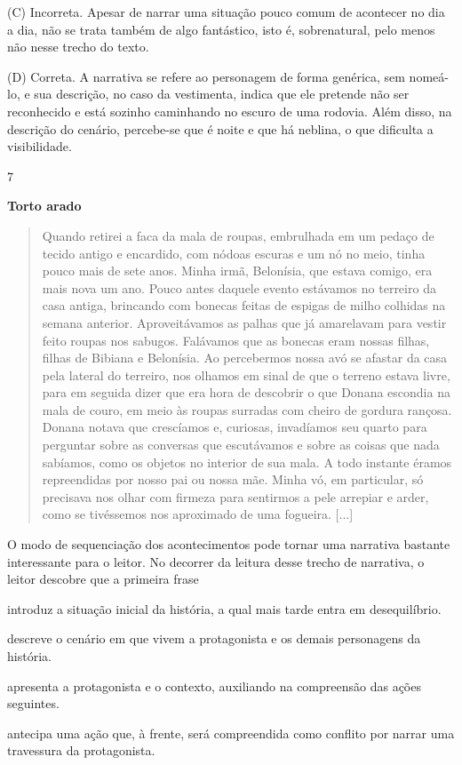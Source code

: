 (C) Incorreta. Apesar de narrar uma situação pouco comum de acontecer no
dia a dia, não se trata também de algo fantástico, isto é, sobrenatural,
pelo menos não nesse trecho do texto.

(D) Correta. A narrativa se refere ao personagem de forma genérica, sem
nomeá-lo, e sua descrição, no caso da vestimenta, indica que ele
pretende não ser reconhecido e está sozinho caminhando no escuro de uma
rodovia. Além disso, na descrição do cenário, percebe-se que é noite e
que há neblina, o que dificulta a visibilidade.

\num{7}

\textbf{Torto arado}

\begin{quote}
Quando retirei a faca da mala de roupas, embrulhada em um pedaço de
tecido antigo e encardido, com nódoas escuras e um nó no meio, tinha
pouco mais de sete anos. Minha irmã, Belonísia, que estava comigo, era
mais nova um ano. Pouco antes daquele evento estávamos no terreiro da
casa antiga, brincando com bonecas feitas de espigas de milho colhidas
na semana anterior. Aproveitávamos as palhas que já amarelavam para
vestir feito roupas nos sabugos. Falávamos que as bonecas eram nossas
filhas, filhas de Bibiana e Belonísia. Ao percebermos nossa avó se
afastar da casa pela lateral do terreiro, nos olhamos em sinal de que o
terreno estava livre, para em seguida dizer que era hora de descobrir o
que Donana escondia na mala de couro, em meio às roupas surradas com
cheiro de gordura rançosa. Donana notava que crescíamos e, curiosas,
invadíamos seu quarto para perguntar sobre as conversas que escutávamos
e sobre as coisas que nada sabíamos, como os objetos no interior de sua
mala. A todo instante éramos repreendidas por nosso pai ou nossa mãe.
Minha vó, em particular, só precisava nos olhar com firmeza para
sentirmos a pele arrepiar e arder, como se tivéssemos nos aproximado de
uma fogueira. {[}...{]}
\end{quote}


O modo de sequenciação dos acontecimentos pode tornar uma narrativa
bastante interessante para o leitor. No decorrer da leitura desse trecho
de narrativa, o leitor descobre que a primeira frase

\begin{escolha}
\item introduz a situação inicial da história, a qual mais tarde entra em
desequilíbrio.

\item descreve o cenário em que vivem a protagonista e os demais
personagens da história.

\item apresenta a protagonista e o contexto, auxiliando na compreensão das
ações seguintes.

\item antecipa uma ação que, à frente, será compreendida como conflito por
narrar uma travessura da protagonista.
\end{escolha}

